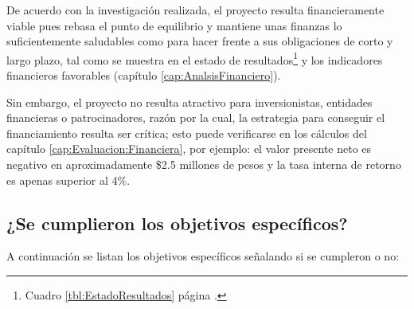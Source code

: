 De acuerdo con la investigación realizada, el proyecto resulta financieramente viable pues rebasa el punto de equilibrio y mantiene unas finanzas lo suficientemente saludables como para hacer frente a sus obligaciones de corto y largo plazo, tal como se muestra en el estado de resultados\footnote{Cuadro \ref{tbl:EstadoResultados} página \pageref{tbl:EstadoResultados}.} y los indicadores financieros favorables (capítulo \ref{cap:AnalsisFinanciero}).

Sin embargo, el proyecto no resulta atractivo para inversionistas, entidades financieras o patrocinadores, razón por la cual, la estrategia para conseguir el financiamiento resulta ser crítica; esto puede verificarse en los cálculos del capítulo \ref{cap:Evaluacion:Financiera}, por ejemplo: el valor presente neto es negativo en aproximadamente \$2.5 millones de pesos y la tasa interna de retorno es apenas superior al 4\%.


\subsection*{¿Se cumplieron los objetivos específicos?}

A continuación se listan los objetivos específicos señalando si se cumpleron o no:

